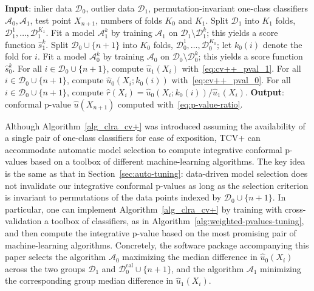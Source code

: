 \documentclass[11pt]{article}
\begin{document}
\begin{algorithm}[H]
    \caption{Integrative conformal p-values via transductive cross-validation+}
    \label{alg_clra_cv+}
    \begin{algorithmic}[1]
        \State \textbf{Input}: inlier data $\mathcal{D}_0$, outlier data $\mathcal{D}_1$, permutation-invariant one-class classifiers $\mathcal{A}_0, \mathcal{A}_1$, test point $X_{n+1}$, numbers of folds $K_0$ and $K_1$.
        \State Split $\mathcal{D}_1$ into $K_1$ folds, $\mathcal{D}_1^1, \dots, \mathcal{D}_1^{K_1}$.
        \State Fit a model $\mathcal{A}^k_1$ by training $\mathcal{A}_1$ on $\mathcal{D}_1 \setminus \mathcal{D}_1^k$; this yields a score function $\hat{s}_1^{k}$.
        \EndFor
        \State Split $\mathcal{D}_0 \cup \{n+1\}$ into $K_0$ folds, $\mathcal{D}_0^1, \dots, \mathcal{D}_0^{K_0}$; let $k_0(i)$ denote the fold for $i$.
        \State Fit a model $\mathcal{A}^k_0$ by training $\mathcal{A}_0$ on $\mathcal{D}_0 \setminus \mathcal{D}_0^k$; this yields a score function $\hat{s}_0^{k}$.
        \EndFor
        \State For all $i \in \mathcal{D}_0 \cup \{n+1\}$, compute $\hat{u}_1(X_i)$ with~\eqref{eq:cv++_pval_1}.
        \State For all $i \in \mathcal{D}_0 \cup \{n+1\}$, compute $\hat{u}_0(X_i; k_0(i))$ with~\eqref{eq:cv++_pval_0}.
        \State For all $i \in \mathcal{D}_0 \cup \{n+1\}$, compute $\hat{r}(X_i) = \hat{u}_0(X_i; k_0(i)) / \hat{u}_1(X_i)$.
        \State \textbf{Output}: conformal p-value $\hat{u}(X_{n+1})$ computed with~\eqref{eq:p-value-ratio}.
    \end{algorithmic}
\end{algorithm}

Although Algorithm~\ref{alg_clra_cv+} was introduced assuming the availability of a single pair of one-class classifiers for ease of exposition, TCV+ can accommodate automatic model selection to compute integrative conformal p-values based on a toolbox of different machine-learning algorithms.
The key idea is the same as that in Section~\ref{sec:auto-tuning}: data-driven model selection does not invalidate our integrative conformal p-values as long as the selection criterion is invariant to permutations of the data points indexed by $\mathcal{D}_0 \cup \{n+1\}$.
In particular, one can implement Algorithm~\ref{alg_clra_cv+} by training with cross-validation a toolbox of classifiers, as in Algorithm~\ref{alg:weighted-pvalues-tuning}, and then compute the integrative p-value based on the most promising pair of machine-learning algorithms.
Concretely, the software package accompanying this paper selects the algorithm $\mathcal{A}_0$ maximizing the median difference in $\hat{u}_0(X_i)$ across the two groups $\mathcal{D}_{1}$ and $\mathcal{D}_{0}^{\mathrm{cal}} \cup \{n+1\}$, and the algorithm $\mathcal{A}_1$ minimizing the corresponding group median difference in $\hat{u}_1(X_i)$.
\end{document}
